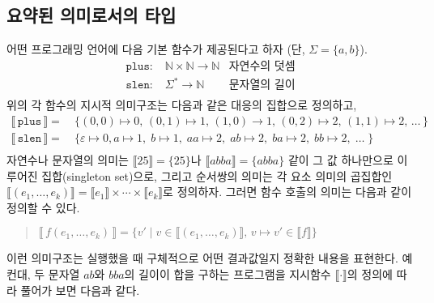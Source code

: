 \subsection{요약된 의미로서의 타입}
어떤 프로그래밍 언어에 다음 기본 함수가 제공된다고 하자 (단, $\Sigma=\{a,b\}$).
\vspace{-1.5ex}
\begin{align*}
\texttt{plus} :\; & \mathbb{N} \times \mathbb{N} \to \mathbb{N} & \text{자연수의 덧셈}\\
\texttt{slen} :\; & \Sigma^{*} \to \mathbb{N} & \text{문자열의 길이}\\[-5.5ex]
\end{align*}
위의 각 함수의 지시적 의미구조는 다음과 같은 대응의 집합으로 정의하고,\vspace*{-1.5ex}
\begin{align*}
 \llbracket\,\texttt{plus}\,\rrbracket
 =~& \{ (0,0)\mapsto 0,\,
        (0,1)\mapsto 1,\,(1,0)\to 1,\,
        (0,2)\mapsto 2,\,(1,1)\mapsto 2,\,
        \ldots\,
     \}
 \\
 \llbracket\,\texttt{slen}\,\rrbracket
 =~& \{ \varepsilon\mapsto 0, 
        a\mapsto 1,\;b\mapsto 1,\;
        aa\mapsto 2,\;ab\mapsto 2,\;ba\mapsto 2,\;bb\mapsto 2,\;
        \ldots\;
     \} \\[-5.5ex]
\end{align*}
자연수나 문자열의 의미는
$\llbracket 25 \rrbracket = \{25\}$나 $\llbracket abba \rrbracket = \{abba\}$ 같이
그 값 하나만으로 이루어진 집합(singleton set)으로, 그리고 순서쌍의 의미는
각 요소 의미의 곱집합인
$\llbracket(e_1,\ldots,e_k)\rrbracket =
 \llbracket e_1\rrbracket\times\cdots\times\llbracket e_k\rrbracket$로 정의하자.
그러면 함수 호출의 의미는 다음과 같이 정의할 수 있다.\vspace*{-1ex}
\begin{quote}
$ \llbracket\,f(e_1,\ldots,e_k)\,\rrbracket
 = \{ v' \mid v \in \llbracket (e_1,\ldots,e_k)\rrbracket,\,
              v\mapsto v' \in \llbracket f\rrbracket \} $
\end{quote}
이런 의미구조는 실행했을 때 구체적으로 어떤 결과값일지 정확한 내용을
표현한다. 예컨대, 두 문자열 $ab$와 $bba$의 길이이 합을 구하는 프로그램을
지시함수 $\llbracket\cdot\rrbracket$의 정의에 따라 풀어가 보면 다음과 같다.
\vspace*{-1.5ex}
